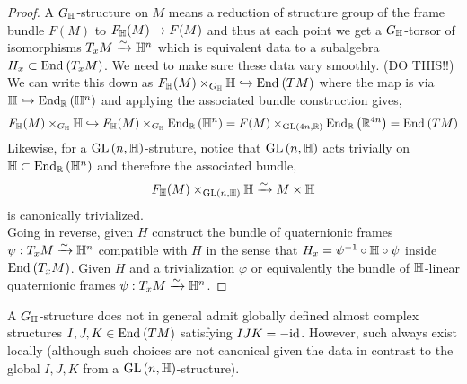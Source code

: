 \documentclass[12pt]{extarticle}
\newcommand{\R}{\mathbb{R}}
\begin{document}
\begin{proof}
A $G_{\mathbb{H}}$-structure on $M$ means a reduction of structure group of the frame bundle $F(M)$ to $F_{\mathbb{H}}(M) \to F(M)$ and thus at each point we get a $G_{\mathbb{H}}$-torsor of isomorphisms $T_x M \xrightarrow{\sim} \mathbb{H}^n$ which is equivalent data to a subalgebra $H_x \subset \mathrm{End}_{}\left(T_x M\right)$. We need to make sure these data vary smoothly. (DO THIS!!) We can write this down as $F_{\mathbb{H}}(M) \times_{G_{\mathbb{H}}} \mathbb{H} \hookrightarrow \mathrm{End}_{}\left(TM\right)$ where the map is via $\H \embed \End{\R}{\H^n}$ and applying the associated bundle construction gives,
\[ F_{\H}(M) \times_{G_{\H}} \H \embed F_{\H}(M) \times_{G_{\H}} \End{\R}{\H^n} = F(M) \times_{\GL{4n, \R}} \End{\R}{\R^{4n}} = \End{}{TM} \]
Likewise, for a $\mathrm{GL}\left(n,\mathbb{H} \right)$-struture, notice that $\mathrm{GL}\left(n,\mathbb{H} \right)$ acts trivially on $\H \subset \End{\R}{\H^n}$ and therefore the associated bundle,
\[ F_{\mathbb{H}}(M) \times_{\mathrm{GL}\left(n, \mathbb{H} \right)} \mathbb{H} \xrightarrow{\sim} M \times \mathbb{H} \]
is canonically trivialized.
\bigskip\\
Going in reverse, given $H$ construct the bundle of quaternionic frames $\psi : T_x M \xrightarrow{\sim} \mathbb{H}^n$ compatible with $H$ in the sense that $H_x = \psi^{-1} \circ \mathbb{H} \circ \psi$ inside $\mathrm{End}_{}\left(T_x M\right)$. Given $H$ and a trivialization $\varphi$ or equivalently the bundle of $\mathbb{H}$-linear quaternionic frames $\psi : T_x M \xrightarrow{\sim} \mathbb{H}^n$.
\end{proof}

\begin{rmk}
A $G_{\mathbb{H}}$-structure does not in general admit globally defined almost complex structures $I, J, K \in \mathrm{End}_{}\left(TM\right)$ satisfying $IJK = - \mathrm{id}$. However, such always exist locally (although such choices are not canonical given the data in contrast to the global $I,J,K$ from a $\mathrm{GL}\left(n, \mathbb{H} \right)$-structure).
\end{rmk}


\newcommand{\C}{\mathbb{C}}
\end{document}
